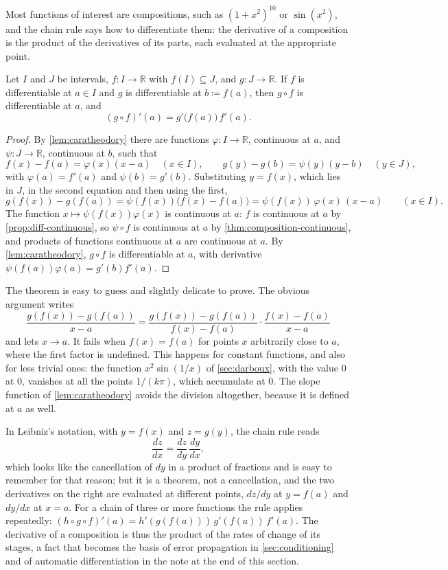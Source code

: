 Most functions of interest are compositions, such as $(1+x^2)^{10}$ or $\sin(x^2)$, and the chain rule says how to differentiate them: the derivative of a composition is the product of the derivatives of its parts, each evaluated at the appropriate point.

\begin{theorem}
\label{thm:chain-rule}
Let $I$ and $J$ be intervals, $f\colon I\to\mathbb R$ with $f(I)\subseteq J$, and $g\colon J\to\mathbb R$. If $f$ is differentiable at $a\in I$ and $g$ is differentiable at $b\coloneqq f(a)$, then $g\circ f$ is differentiable at $a$, and
\[
(g\circ f)'(a)=g'\bigl(f(a)\bigr)\,f'(a).
\]
\end{theorem}

\begin{proof}
By \cref{lem:caratheodory} there are functions $\varphi\colon I\to\mathbb R$, continuous at $a$, and $\psi\colon J\to\mathbb R$, continuous at $b$, such that
\[
f(x)-f(a)=\varphi(x)(x-a)\quad(x\in I),\qquad g(y)-g(b)=\psi(y)(y-b)\quad(y\in J),
\]
with $\varphi(a)=f'(a)$ and $\psi(b)=g'(b)$. Substituting $y=f(x)$, which lies in $J$, in the second equation and then using the first,
\[
g(f(x))-g(f(a))=\psi(f(x))\bigl(f(x)-f(a)\bigr)=\psi(f(x))\,\varphi(x)\,(x-a)\qquad(x\in I).
\]
The function $x\mapsto\psi(f(x))\varphi(x)$ is continuous at $a$: $f$ is continuous at $a$ by \cref{prop:diff-continuous}, so $\psi\circ f$ is continuous at $a$ by \cref{thm:composition-continuous}, and products of functions continuous at $a$ are continuous at $a$. By \cref{lem:caratheodory}, $g\circ f$ is differentiable at $a$, with derivative $\psi(f(a))\varphi(a)=g'(b)f'(a)$.
\end{proof}

The theorem is easy to guess and slightly delicate to prove. The obvious argument writes
\[
\frac{g(f(x))-g(f(a))}{x-a}=\frac{g(f(x))-g(f(a))}{f(x)-f(a)}\cdot\frac{f(x)-f(a)}{x-a}
\]
and lets $x\to a$. It fails when $f(x)=f(a)$ for points $x$ arbitrarily close to $a$, where the first factor is undefined. This happens for constant functions, and also for less trivial ones: the function $x^2\sin(1/x)$ of \cref{sec:darboux}, with the value $0$ at $0$, vanishes at all the points $1/(k\pi)$, which accumulate at $0$. The slope function of \cref{lem:caratheodory} avoids the division altogether, because it is defined at $a$ as well.

In Leibniz's notation, with $y=f(x)$ and $z=g(y)$, the chain rule reads
\[
\frac{dz}{dx}=\frac{dz}{dy}\,\frac{dy}{dx},
\]
which looks like the cancellation of $dy$ in a product of fractions and is easy to remember for that reason; but it is a theorem, not a cancellation, and the two derivatives on the right are evaluated at different points, $dz/dy$ at $y=f(a)$ and $dy/dx$ at $x=a$. For a chain of three or more functions the rule applies repeatedly: $(h\circ g\circ f)'(a)=h'(g(f(a)))\,g'(f(a))\,f'(a)$. The derivative of a composition is thus the product of the rates of change of its stages, a fact that becomes the basis of error propagation in \cref{sec:conditioning} and of automatic differentiation in the note at the end of this section.

